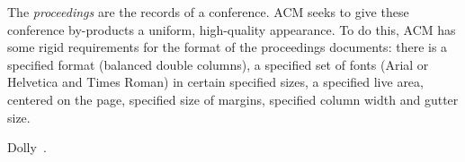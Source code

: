 \documentclass[sigplan, anonymous, review]{acmart}
\begin{document}
The \textit{proceedings} are the records of a conference.  ACM seeks to give
these conference by-products a uniform, high-quality appearance.  To do this,
ACM has some rigid requirements for the format of the proceedings documents:
there is a specified format (balanced double columns), a specified set of fonts
(Arial or Helvetica and Times Roman) in certain specified sizes, a specified
live area, centered on the page, specified size of margins, specified column
width and gutter size.

Dolly~\cite{ananthanarayanan2013effective}.



\end{document}
